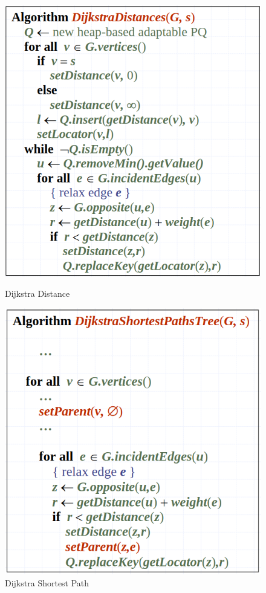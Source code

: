 \begin{figure}[ht!]
	\centering
	\begin{minipage}[t]{0.4\textwidth}
		\centering
		\includegraphics[width=\linewidth]{images/dijkstra_alg}
		\caption{Dijkstra Distance}
		\label{fig:dijkstraalg}
	\end{minipage}
	\begin{minipage}[t]{0.4\textwidth}
		\centering
		\includegraphics[width=\linewidth]{images/dijkstra_shortest}
		\caption{Dijkstra Shortest Path}
		\label{fig:dijkstrashort}
	\end{minipage}
\end{figure}

